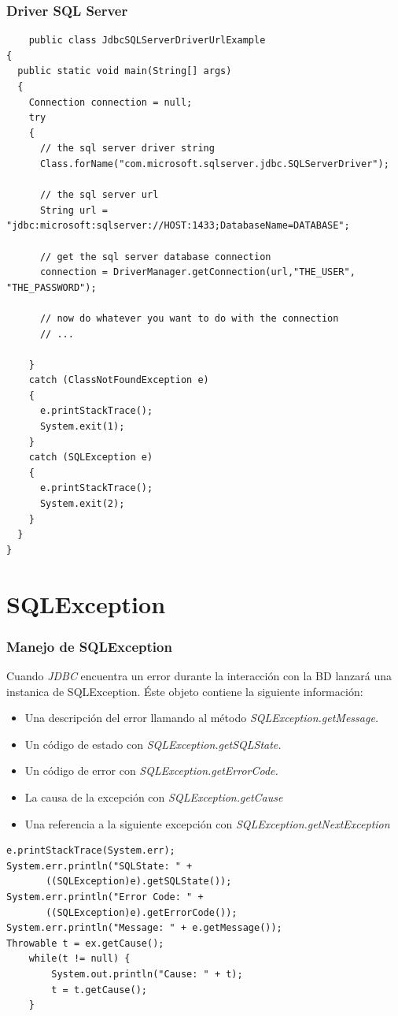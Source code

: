 \documentclass{beamer}
\begin{document}
\begin{frame}[fragile]
\frametitle{Driver SQL Server}
\begin{tiny}
\begin{verbatim}
    public class JdbcSQLServerDriverUrlExample
{
  public static void main(String[] args)
  {
    Connection connection = null;
    try
    {
      // the sql server driver string
      Class.forName("com.microsoft.sqlserver.jdbc.SQLServerDriver");

      // the sql server url
      String url = "jdbc:microsoft:sqlserver://HOST:1433;DatabaseName=DATABASE";

      // get the sql server database connection
      connection = DriverManager.getConnection(url,"THE_USER", "THE_PASSWORD");

      // now do whatever you want to do with the connection
      // ...

    }
    catch (ClassNotFoundException e)
    {
      e.printStackTrace();
      System.exit(1);
    }
    catch (SQLException e)
    {
      e.printStackTrace();
      System.exit(2);
    }
  }
}
\end{verbatim}
\end{tiny}
\end{frame}


\section{SQLException}
\begin{frame}[fragile]
\frametitle{Manejo de SQLException}
\begin{scriptsize}
Cuando \emph{JDBC} encuentra un error durante la interacción con la BD lanzará una instanica de \alert{SQLException}. Éste objeto contiene la siguiente información:
\begin{itemize}[<+->]
\item Una descripción del error llamando al método \emph{SQLException.getMessage.}
\item Un código de estado con \emph{SQLException.getSQLState.}
\item Un código de error con \emph{ SQLException.getErrorCode.}
\item La causa de la excepción con \emph{SQLException.getCause}
\item Una referencia a la siguiente excepción con \emph{ SQLException.getNextException}
\end{itemize}
\pause
\begin{verbatim}
e.printStackTrace(System.err);
System.err.println("SQLState: " +
       ((SQLException)e).getSQLState());
System.err.println("Error Code: " +
       ((SQLException)e).getErrorCode());
System.err.println("Message: " + e.getMessage());
Throwable t = ex.getCause();
    while(t != null) {
        System.out.println("Cause: " + t);
        t = t.getCause();
    }
\end{verbatim}
\end{scriptsize}
\end{frame}
\end{document}
